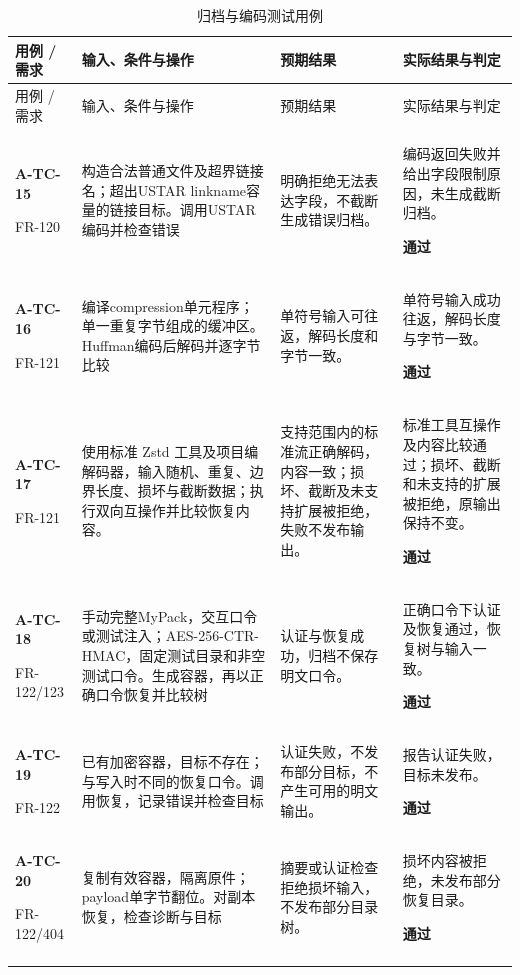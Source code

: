 \begin{longtable}{@{}L{.14\linewidth}L{.36\linewidth}L{.21\linewidth}L{.23\linewidth}@{}}
\caption{归档与编码测试用例}\label{tab:test-3}\\
\toprule 用例 / 需求 & 输入、条件与操作 & 预期结果 & 实际结果与判定\\\midrule\endfirsthead
\toprule 用例 / 需求 & 输入、条件与操作 & 预期结果 & 实际结果与判定\\\midrule\endhead
\bottomrule\endfoot
\textbf{A-TC-15}\par{\footnotesize FR-120} & 构造合法普通文件及超界链接名；超出USTAR linkname容量的链接目标。调用USTAR编码并检查错误 & 明确拒绝无法表达字段，不截断生成错误归档。 & 编码返回失败并给出字段限制原因，未生成截断归档。\par\textbf{通过}\\\addlinespace[2pt]
\textbf{A-TC-16}\par{\footnotesize FR-121} & 编译compression单元程序；单一重复字节组成的缓冲区。Huffman编码后解码并逐字节比较 & 单符号输入可往返，解码长度和字节一致。 & 单符号输入成功往返，解码长度与字节一致。\par\textbf{通过}\\\addlinespace[2pt]
\textbf{A-TC-17}\par{\footnotesize FR-121} & 使用标准 Zstd 工具及项目编解码器，输入随机、重复、边界长度、损坏与截断数据；执行双向互操作并比较恢复内容。 & 支持范围内的标准流正确解码，内容一致；损坏、截断及未支持扩展被拒绝，失败不发布输出。 & 标准工具互操作及内容比较通过；损坏、截断和未支持的扩展被拒绝，原输出保持不变。\par\textbf{通过}\\\addlinespace[2pt]
\textbf{A-TC-18}\par{\footnotesize FR-122/123} & 手动完整MyPack，交互口令或测试注入；AES-256-CTR-HMAC，固定测试目录和非空测试口令。生成容器，再以正确口令恢复并比较树 & 认证与恢复成功，归档不保存明文口令。 & 正确口令下认证及恢复通过，恢复树与输入一致。\par\textbf{通过}\\\addlinespace[2pt]
\textbf{A-TC-19}\par{\footnotesize FR-122} & 已有加密容器，目标不存在；与写入时不同的恢复口令。调用恢复，记录错误并检查目标 & 认证失败，不发布部分目标，不产生可用的明文输出。 & 报告认证失败，目标未发布。\par\textbf{通过}\\\addlinespace[2pt]
\textbf{A-TC-20}\par{\footnotesize FR-122/404} & 复制有效容器，隔离原件；payload单字节翻位。对副本恢复，检查诊断与目标 & 摘要或认证检查拒绝损坏输入，不发布部分目录树。 & 损坏内容被拒绝，未发布部分恢复目录。\par\textbf{通过}\\\addlinespace[2pt]
\end{longtable}

